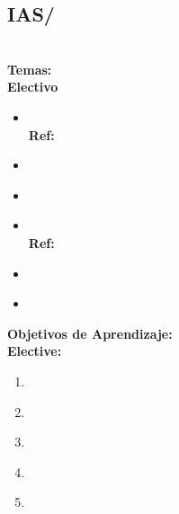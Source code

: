 \subsection{IAS/\IASSecureSoftwareEngineering}\label{sec:BOK:IASSecureSoftwareEngineering}
\IASSecureSoftwareEngineeringDescription\\
\noindent \textbf{Temas:}\\
\noindent \textbf{Electivo}
\begin{itemize}
	\item \IASSecureSoftwareEngineeringTopicBuilding\xspace \\ \textbf{Ref:} \label{sec:BOK:IASSecureSoftwareEngineeringTopicBuilding}
	\item \IASSecureSoftwareEngineeringTopicSecure\label{sec:BOK:IASSecureSoftwareEngineeringTopicSecure}
	\item \IASSecureSoftwareEngineeringTopicSecureSoftware\label{sec:BOK:IASSecureSoftwareEngineeringTopicSecureSoftware}
	\item \IASSecureSoftwareEngineeringTopicSecureSoftwareDevelopment\xspace \\ \textbf{Ref:} \label{sec:BOK:IASSecureSoftwareEngineeringTopicSecureSoftwareDevelopment}
	\item \IASSecureSoftwareEngineeringTopicSecureTesting\label{sec:BOK:IASSecureSoftwareEngineeringTopicSecureTesting}
	\item \IASSecureSoftwareEngineeringTopicSoftware\label{sec:BOK:IASSecureSoftwareEngineeringTopicSoftware}
\end{itemize}


\noindent \textbf{Objetivos de Aprendizaje:}\\
\noindent \textbf{Elective:}
\begin{enumerate}
	\setcounter{enumi}{0}
	\item \IASSecureSoftwareEngineeringLODescribeTheIntegrating\xspace[\IASSecureSoftwareEngineeringLODescribeTheIntegratingLevel]\label{sec:BOK:IASSecureSoftwareEngineeringLODescribeTheIntegrating}
	\item \IASSecureSoftwareEngineeringLOApplyTheThe\xspace[\IASSecureSoftwareEngineeringLOApplyTheTheLevel]\label{sec:BOK:IASSecureSoftwareEngineeringLOApplyTheThe}
	\item \IASSecureSoftwareEngineeringLODevelopSpecifications\xspace[\IASSecureSoftwareEngineeringLODevelopSpecificationsLevel]\label{sec:BOK:IASSecureSoftwareEngineeringLODevelopSpecifications}
	\item \IASSecureSoftwareEngineeringLODescribeSoftware\xspace[\IASSecureSoftwareEngineeringLODescribeSoftwareLevel]\label{sec:BOK:IASSecureSoftwareEngineeringLODescribeSoftware}
	\item \IASSecureSoftwareEngineeringLOConductA\xspace[\IASSecureSoftwareEngineeringLOConductALevel]\label{sec:BOK:IASSecureSoftwareEngineeringLOConductA}
\end{enumerate}




